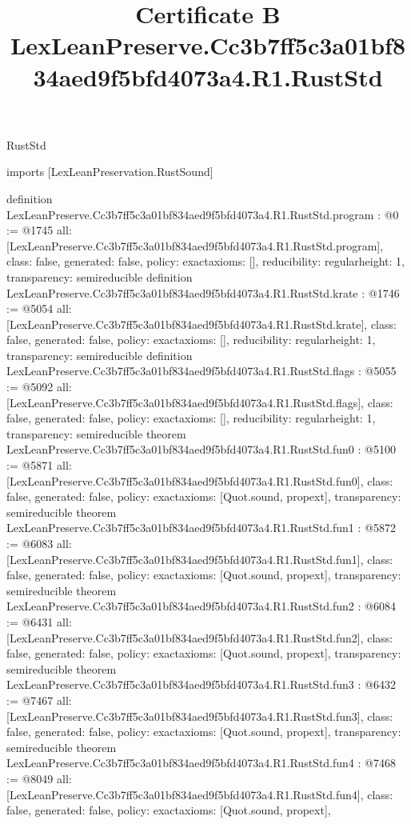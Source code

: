 \begin{lexlean}{RustStd}
\title{Certificate B LexLeanPreserve.Cc3b7ff5c3a01bf834aed9f5bfd4073a4.R1.RustStd}
\begin{coremodule}
imports [LexLeanPreservation.RustSound]

definition LexLeanPreserve.Cc3b7ff5c3a01bf834aed9f5bfd4073a4.R1.RustStd.program : @0 := @1745 {
  all: [LexLeanPreserve.Cc3b7ff5c3a01bf834aed9f5bfd4073a4.R1.RustStd.program],
  class: false,
  generated: false,
  policy: exact{axioms: []},
  reducibility: regular{height: 1},
  transparency: semireducible
}
definition LexLeanPreserve.Cc3b7ff5c3a01bf834aed9f5bfd4073a4.R1.RustStd.krate : @1746 := @5054 {
  all: [LexLeanPreserve.Cc3b7ff5c3a01bf834aed9f5bfd4073a4.R1.RustStd.krate],
  class: false,
  generated: false,
  policy: exact{axioms: []},
  reducibility: regular{height: 1},
  transparency: semireducible
}
definition LexLeanPreserve.Cc3b7ff5c3a01bf834aed9f5bfd4073a4.R1.RustStd.flags : @5055 := @5092 {
  all: [LexLeanPreserve.Cc3b7ff5c3a01bf834aed9f5bfd4073a4.R1.RustStd.flags],
  class: false,
  generated: false,
  policy: exact{axioms: []},
  reducibility: regular{height: 1},
  transparency: semireducible
}
theorem LexLeanPreserve.Cc3b7ff5c3a01bf834aed9f5bfd4073a4.R1.RustStd.fun0 : @5100 := @5871 {
  all: [LexLeanPreserve.Cc3b7ff5c3a01bf834aed9f5bfd4073a4.R1.RustStd.fun0],
  class: false,
  generated: false,
  policy: exact{axioms: [Quot.sound, propext]},
  transparency: semireducible
}
theorem LexLeanPreserve.Cc3b7ff5c3a01bf834aed9f5bfd4073a4.R1.RustStd.fun1 : @5872 := @6083 {
  all: [LexLeanPreserve.Cc3b7ff5c3a01bf834aed9f5bfd4073a4.R1.RustStd.fun1],
  class: false,
  generated: false,
  policy: exact{axioms: [Quot.sound, propext]},
  transparency: semireducible
}
theorem LexLeanPreserve.Cc3b7ff5c3a01bf834aed9f5bfd4073a4.R1.RustStd.fun2 : @6084 := @6431 {
  all: [LexLeanPreserve.Cc3b7ff5c3a01bf834aed9f5bfd4073a4.R1.RustStd.fun2],
  class: false,
  generated: false,
  policy: exact{axioms: [Quot.sound, propext]},
  transparency: semireducible
}
theorem LexLeanPreserve.Cc3b7ff5c3a01bf834aed9f5bfd4073a4.R1.RustStd.fun3 : @6432 := @7467 {
  all: [LexLeanPreserve.Cc3b7ff5c3a01bf834aed9f5bfd4073a4.R1.RustStd.fun3],
  class: false,
  generated: false,
  policy: exact{axioms: [Quot.sound, propext]},
  transparency: semireducible
}
theorem LexLeanPreserve.Cc3b7ff5c3a01bf834aed9f5bfd4073a4.R1.RustStd.fun4 : @7468 := @8049 {
  all: [LexLeanPreserve.Cc3b7ff5c3a01bf834aed9f5bfd4073a4.R1.RustStd.fun4],
  class: false,
  generated: false,
  policy: exact{axioms: [Quot.sound, propext]},
}
\end{coremodule}
\end{lexlean}
